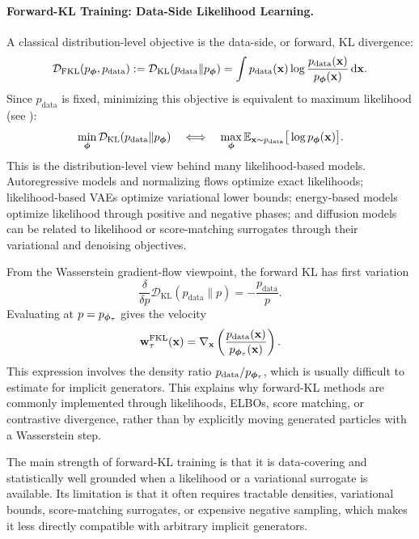 \paragraph{Forward-KL Training: Data-Side Likelihood Learning.}
A classical distribution-level objective is the data-side, or forward, KL
divergence:
\[
    \mathcal{D}_{\mathrm{FKL}}(p_{{\bm{\phi}}},p_{\mathrm{data}})
    :=
    \mathcal D_{\mathrm{KL}}(p_{\mathrm{data}}\|p_{{\bm{\phi}}})
    =
    \int
    p_{\mathrm{data}}({\mathbf{x}})
    \log
    \frac{p_{\mathrm{data}}({\mathbf{x}})}{p_{{\bm{\phi}}}({\mathbf{x}})}
    \mathop{}\!\mathrm{d}{\mathbf{x}}.
\]
Since $p_{\mathrm{data}}$ is fixed, minimizing this objective is equivalent to
maximum likelihood (see ):
\[
    \min_{{\bm{\phi}}}
    \mathcal D_{\mathrm{KL}}(p_{\mathrm{data}}\|p_{{\bm{\phi}}})
    \quad
    \Longleftrightarrow
    \quad
    \max_{{\bm{\phi}}}
    \mathbb{E}_{{\mathbf{x}}\sim p_{\mathrm{data}}}
    \big[
        \log p_{{\bm{\phi}}}({\mathbf{x}})
    \big].
\]
This is the distribution-level view behind many likelihood-based models.
Autoregressive models and normalizing flows optimize exact likelihoods;
likelihood-based VAEs optimize variational lower bounds; energy-based models
optimize likelihood through positive and negative phases; and diffusion models
can be related to likelihood or score-matching surrogates through their
variational and denoising objectives.

From the Wasserstein gradient-flow viewpoint, the forward KL has first
variation
\[
    \frac{\delta}{\delta p}
    \mathcal D_{\mathrm{KL}}(p_{\mathrm{data}}\|p)
    =
    -
    \frac{p_{\mathrm{data}}}{p}.
\]
Evaluating at $p=p_{{\bm{\phi}}_\tau}$ gives the velocity
\[
    {\mathbf{w}}_\tau^{\mathrm{FKL}}({\mathbf{x}})
    =
    \nabla_{{\mathbf{x}}}
    \left(
        \frac{p_{\mathrm{data}}({\mathbf{x}})}
             {p_{{\bm{\phi}}_\tau}({\mathbf{x}})}
    \right).
\]
This expression involves the density ratio
$p_{\mathrm{data}}/p_{{\bm{\phi}}_\tau}$, which is usually difficult to estimate for
implicit generators.  This explains why forward-KL methods are commonly
implemented through likelihoods, ELBOs, score matching, or contrastive
divergence, rather than by explicitly moving generated particles with a
Wasserstein step.

The main strength of forward-KL training is that it is data-covering and
statistically well grounded when a likelihood or a variational surrogate is
available.  Its limitation is that it often requires tractable densities,
variational bounds, score-matching surrogates, or expensive negative sampling,
which makes it less directly compatible with arbitrary implicit generators.


